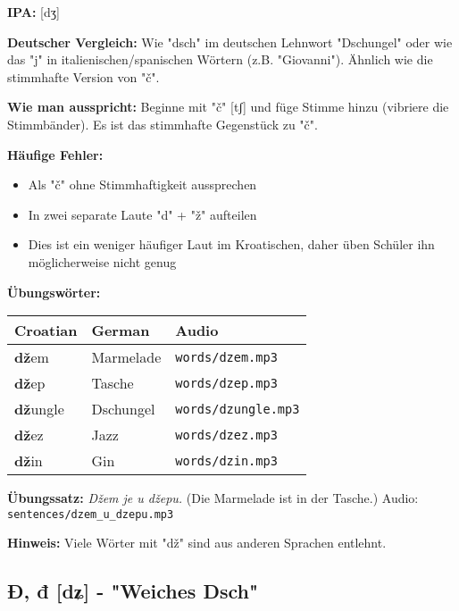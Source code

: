\begin{tcolorbox}[colback=lightblue!30, colframe=croatianblue, title=\textbf{Dž, dž}]

\textbf{IPA:} [dʒ]

\textbf{Deutscher Vergleich:}
Wie "dsch" im deutschen Lehnwort "Dschungel" oder wie das "j" in italienischen/spanischen Wörtern (z.B. "Giovanni"). Ähnlich wie die stimmhafte Version von "č".

\textbf{Wie man ausspricht:}
Beginne mit "č" [tʃ] und füge Stimme hinzu (vibriere die Stimmbänder). Es ist das stimmhafte Gegenstück zu "č".

\textbf{Häufige Fehler:}
\begin{itemize}
    \item Als "č" ohne Stimmhaftigkeit aussprechen
    \item In zwei separate Laute "d" + "ž" aufteilen
    \item Dies ist ein weniger häufiger Laut im Kroatischen, daher üben Schüler ihn möglicherweise nicht genug
\end{itemize}

\textbf{Übungswörter:}
\begin{tabular}{lll}
\textbf{Croatian} & \textbf{German} & \textbf{Audio} \\
\midrule
\textbf{dž}em & Marmelade & \texttt{words/dzem.mp3} \\
\textbf{dž}ep & Tasche & \texttt{words/dzep.mp3} \\
\textbf{dž}ungle & Dschungel & \texttt{words/dzungle.mp3} \\
\textbf{dž}ez & Jazz & \texttt{words/dzez.mp3} \\
\textbf{dž}in & Gin & \texttt{words/dzin.mp3} \\
\end{tabular}

\textbf{Übungssatz:}
\textit{Džem je u džepu.}
(Die Marmelade ist in der Tasche.)
Audio: \texttt{sentences/dzem\_u\_dzepu.mp3}

\textbf{Hinweis:}
Viele Wörter mit "dž" sind aus anderen Sprachen entlehnt.

\end{tcolorbox}

\subsection{Đ, đ [dʑ] - "Weiches Dsch"}

